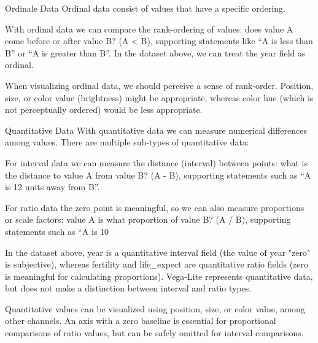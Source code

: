 \documentclass[aspectratio=1610]{beamer}
\begin{document}
\begin{frame}{Ordinale Data}
	\small
	Ordinal data consist of values that have a specific ordering.

	\vspace{1em}

	With ordinal data we can compare the rank-ordering of values: does value A come
	before or after value B? (A < B), supporting statements like “A is less than B”
	or “A is greater than B”. In the dataset above, we can treat the year field as
	ordinal.

	\vspace{1em}

	When visualizing ordinal data, we should perceive a sense of rank-order.
	Position, size, or color value (brightness) might be appropriate, whereas color
	hue (which is not perceptually ordered) would be less appropriate.

\end{frame}

\begin{frame}{Quantitative Data}
	\small
	With quantitative data we can measure numerical differences among values. There are multiple sub-types of quantitative data:

	\vspace{1em}

	For interval data we can measure the distance (interval) between points: what is the distance to value A from value B? (A - B), supporting statements such as “A is 12 units away from B”.

	\vspace{1em}

	For ratio data the zero point is meaningful, so we can also measure proportions or scale factors: value A is what proportion of value B? (A / B), supporting statements such as “A is 10%

	\vspace{1em}

	In the dataset above, year is a quantitative interval field (the value of year "zero" is subjective), whereas fertility and life_expect are quantitative ratio fields (zero is meaningful for calculating proportions). Vega-Lite represents quantitative data, but does not make a distinction between interval and ratio types.

	\vspace{1em}

	Quantitative values can be visualized using position, size, or color value, among other channels. An axis with a zero baseline is essential for proportional comparisons of ratio values, but can be safely omitted for interval comparisons.
\end{frame}
\end{document}
